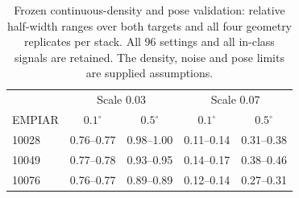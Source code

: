 \begin{table}[t]
\centering\small\setlength{\tabcolsep}{3pt}
\caption{Frozen continuous-density and pose validation: relative half-width ranges over both targets and all four geometry replicates per stack. All 96 settings and all in-class signals are retained. The density, noise and pose limits are supplied assumptions.}
\label{tab:frozenuncertainty}
\begin{tabular}{lcccc}
\toprule
 & \multicolumn{2}{c}{Scale 0.03} & \multicolumn{2}{c}{Scale 0.07} \\
EMPIAR & $0.1^\circ$ & $0.5^\circ$ & $0.1^\circ$ & $0.5^\circ$ \\
\midrule
10028 & 0.76--0.77 & 0.98--1.00 & 0.11--0.14 & 0.31--0.38 \\
10049 & 0.77--0.78 & 0.93--0.95 & 0.14--0.17 & 0.38--0.46 \\
10076 & 0.76--0.77 & 0.89--0.89 & 0.12--0.14 & 0.27--0.31 \\
\bottomrule
\end{tabular}
\end{table}
